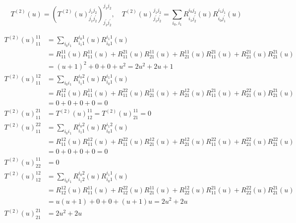 \documentclass[12pt,a4paper]{ltjsarticle}
\begin{document}
\begin{enumerate}
       \begin{equation}
        T^{(2)}(u) = \left( T^{(2)}(u)^{j_{1}j_{2}}_{j_{1}^{\prime}j_{2}^{\prime}} \right)^{j_{1}j_{2}}_{j_{1}^{\prime}j_{2}^{\prime}}
         ,\quad
        T^{(2)}(u)^{j_{1}j_{2}}_{j_{1}^{\prime}j_{2}^{\prime}}
        = \sum_{i_{0},i_{1}} R^{i_{0}j_{2}}_{i_{1}j_{2}^{\prime}}(u) R^{i_{1}j_{1}}_{i_{0}j_{1}^{\prime}}(u)
       \end{equation}



      \begin{align}
       T^{(2)}(u)^{11}_{11}
       &= \sum_{i_{0}i_{1}} R^{i_{0}1}_{i_{1}1}(u) R^{i_{1}1}_{i_{0}1}(u)\\
       &= R^{11}_{11}(u) R^{11}_{11}(u) + R^{21}_{11}(u) R^{11}_{21}(u) + R^{11}_{21}(u) R^{21}_{11}(u)  + R^{21}_{21}(u) R^{21}_{21}(u) \nonumber \\
       &= (u+1)^{2} + 0 + 0 + u^{2} = 2u^{2}+ 2u +1\\
       T^{(2)}(u)^{12}_{11}
       &= \sum_{i_{0}i_{1}} R^{i_{0}2}_{i_{1}1}(u) R^{i_{1}1}_{i_{0}1}(u)\\
       &= R^{12}_{11}(u) R^{11}_{11}(u) + R^{22}_{11}(u) R^{11}_{21}(u) + R^{12}_{21}(u) R^{21}_{11}(u)  + R^{22}_{21}(u) R^{21}_{21}(u) \nonumber \\
       &= 0 + 0 + 0 + 0 = 0\\
       T^{(2)}(u)^{21}_{11}
       &= T^{(2)}(u)^{11}_{12} = T^{(2)}(u)^{11}_{21} = 0
      \end{align}
      \begin{align}
       T^{(2)}(u)^{22}_{11}
       &= \sum_{i_{0}i_{1}} R^{i_{0}2}_{i_{1}1}(u) R^{i_{1}2}_{i_{0}1}(u)\\
       &= R^{12}_{11}(u) R^{12}_{11}(u) + R^{22}_{11}(u) R^{12}_{21}(u) + R^{12}_{21}(u) R^{22}_{11}(u)  + R^{22}_{21}(u) R^{22}_{21}(u) \nonumber \\
       &= 0 + 0 + 0 + 0 = 0\\
       T^{(2)}(u)^{11}_{22} &= 0\\
       T^{(2)}(u)^{12}_{12}
       &= \sum_{i_{0}i_{1}} R^{i_{0}2}_{i_{1}2}(u) R^{i_{1}1}_{i_{0}1}(u)\\
       &= R^{12}_{12}(u) R^{11}_{11}(u) + R^{22}_{12}(u) R^{11}_{21}(u) + R^{12}_{22}(u) R^{21}_{11}(u)  + R^{22}_{22}(u) R^{21}_{21}(u) \nonumber \\
       &= u(u+1) + 0 + 0 + (u+1)u = 2u^{2}+2u\\
       T^{(2)}(u)^{21}_{21} &=2u^{2}+2u\\

\end{align}
\end{enumerate}
\end{document}
